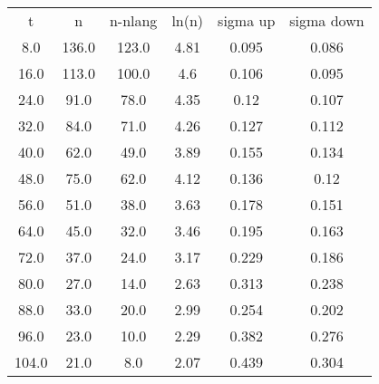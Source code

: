 \begin{table}
\begin{tabular}{cccccc}
t & n & n-nlang & ln(n) & sigma up & sigma down \\
8.0 & 136.0 & 123.0 & 4.81 & 0.095 & 0.086 \\
16.0 & 113.0 & 100.0 & 4.6 & 0.106 & 0.095 \\
24.0 & 91.0 & 78.0 & 4.35 & 0.12 & 0.107 \\
32.0 & 84.0 & 71.0 & 4.26 & 0.127 & 0.112 \\
40.0 & 62.0 & 49.0 & 3.89 & 0.155 & 0.134 \\
48.0 & 75.0 & 62.0 & 4.12 & 0.136 & 0.12 \\
56.0 & 51.0 & 38.0 & 3.63 & 0.178 & 0.151 \\
64.0 & 45.0 & 32.0 & 3.46 & 0.195 & 0.163 \\
72.0 & 37.0 & 24.0 & 3.17 & 0.229 & 0.186 \\
80.0 & 27.0 & 14.0 & 2.63 & 0.313 & 0.238 \\
88.0 & 33.0 & 20.0 & 2.99 & 0.254 & 0.202 \\
96.0 & 23.0 & 10.0 & 2.29 & 0.382 & 0.276 \\
104.0 & 21.0 & 8.0 & 2.07 & 0.439 & 0.304 \\
\end{tabular}
\end{table}
